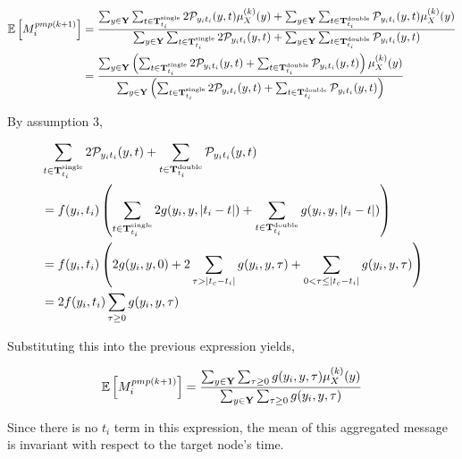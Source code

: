 \begin{align}
\mathbb E\left[{M_{ i}^{pmp(k+1)}}\right] &= {\sum_{y\in \bold{Y}}\sum_{t\in\bold{T}_{t_i}^{\text{single}}}2\mathcal{P}_{y_i t_i}(y, t) \mu_{X}^{(k)}(y)+\sum_{y\in \bold{Y}}\sum_{t\in\bold{T}_{t_i}^{\text{double}}}\mathcal{P}_{y_i t_i}(y, t) \mu_{X}^{(k)}(y)\over \sum_{y\in \bold{Y}}\sum_{t\in\bold{T}_{t_i}^{\text{single}}}2\mathcal{P}_{y_i t_i}(y, t)+\sum_{y\in \bold{Y}}\sum_{t\in\bold{T}_{t_i}^{\text{double}}}\mathcal{P}_{y_i t_i}(y, t)}\\&={\sum_{y\in \bold{Y}}\left(\sum_{t\in\bold{T}_{t_i}^{\text{single}}}2\mathcal{P}_{y_i t_i}(y, t)+\sum_{t\in\bold{T}_{t_i}^{\text{double}}}\mathcal{P}_{y_i t_i}(y, t)\right)\mu_{X}^{(k)}(y)\over\sum_{y\in \bold{Y}}\left(\sum_{t\in\bold{T}_{t_i}^{\text{single}}}2\mathcal{P}_{y_i t_i}(y, t)+\sum_{t\in\bold{T}_{t_i}^{\text{double}}}\mathcal{P}_{y_i t_i}(y, t)\right)}
\end{align}

By assumption 3,

\begin{align}
&\sum_{t\in\bold{T}_{t_i}^{\text{single}}}2\mathcal{P}_{y_i t_i}(y, t)+\sum_{t\in\bold{T}_{t_i}^{\text{double}}}\mathcal{P}_{y_i t_i}(y, t) \\&=f(y_i, t_i )\left(\sum_{t\in\bold{T}_{t_i}^{\text{single}}}2g(y_i, y, |t_i - t|)+\sum_{t\in\bold{T}_{t_i}^{\text{double}}}g(y_i, y, |t_i - t|)\right)\\&=f(y_i, t_i )\left(2g(y_i, y, 0)+2\sum_{\tau>|t_{c}-t_i |}g(y_i, y,\tau)+\sum_{0<\tau\le|t_{c}-t_i|}g(y_i, y, \tau)\right) \\&= 2f(y_i, t_i )\sum_{\tau\ge 0}g(y_i, y, \tau)
\end{align}


Substituting this into the previous expression yields,

\begin{align}
\mathbb E\left[{M_{ i}^{pmp(k+1)}}\right]={\sum_{y\in \bold{Y}}\sum_{\tau\ge 0}g(y_i, y, \tau)\mu_{X}^{(k)}(y)\over\sum_{y\in \bold{Y}}\sum_{\tau\ge 0}g(y_i, y, \tau)}
\end{align}

Since there is no $t_i$ term in this expression, the mean of this aggregated message is invariant with respect to the target node's time.














